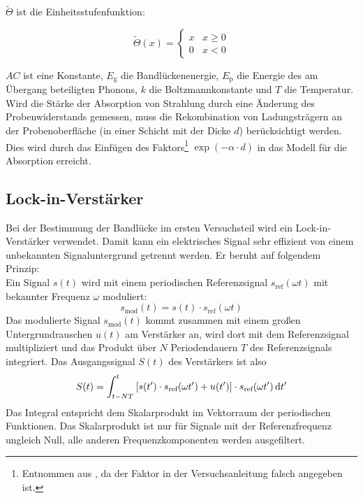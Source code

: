 $\tilde{\Theta}$ ist die Einheitsstufenfunktion:

\begin{equation}
\label{}
\tilde{\Theta}(x)=
\begin{cases}
x & x \geq 0 \\
0 & x < 0
\end{cases}
\end{equation}

$AC$ ist eine Konstante,
$E_{\text{g}}$ die Bandlückenenergie, $E_{\text{p}}$ die Energie des am Übergang beteiligten Phonons,
$k$ die Boltzmannkonstante und $T$ die Temperatur.\\
Wird die Stärke der Absorption von Strahlung durch eine Änderung des Probenwiderstands gemessen,
muss die Rekombination von Ladungsträgern an der Probenoberfläche
(in einer Schicht mit der Dicke $d$) berücksichtigt werden.
Dies wird durch das Einfügen des
Faktors\footnote{Entnommen aus \cite{staatsex}, da der Faktor in der Versuchsanleitung falsch angegeben ist.}
$\exp(-\alpha \cdot d)$ in das Modell für die Absorption erreicht.

\subsection{Lock-in-Verstärker}
Bei der Bestimmung der Bandlücke im ersten Versuchsteil wird ein Lock-in-Verstärker verwendet.
Damit kann ein elektrisches Signal sehr effizient von einem unbekannten Signaluntergrund getrennt werden.
Er beruht auf folgendem Prinzip:\\
Ein Signal $s(t)$ wird mit einem periodischen Referenzsignal $s_{\text{ref}}(\omega t)$
mit bekannter Frequenz $\omega$ moduliert:
\begin{equation}
\label{}
s_{\text{mod}}(t) = s(t) \cdot s_{\text{ref}}(\omega t)
\end{equation}
Das modulierte Signal $s_{\text{mod}}(t)$ kommt zusammen mit einem großen Untergrundrauschen $u(t)$
am Verstärker an, wird dort mit dem Referenzsignal multipliziert und das Produkt über $N$
Periodendauern $T$ des Referenzsignals integriert. Das Ausgangssignal $S(t)$ des Verstärkers ist also
\begin{equation}
\label{}
S(t) = \int_{t-N T}^t{[s(t') \cdot s_{\text{ref}}(\omega t') + u(t')] \cdot s_{\text{ref}}(\omega t')} \,\mathrm{d} t'
\end{equation}
Das Integral entspricht dem Skalarprodukt im Vektorraum der periodischen Funktionen.
Das Skalarprodukt ist nur für Signale mit der Referenzfrequenz ungleich Null,
alle anderen Frequenzkomponenten werden ausgefiltert.

